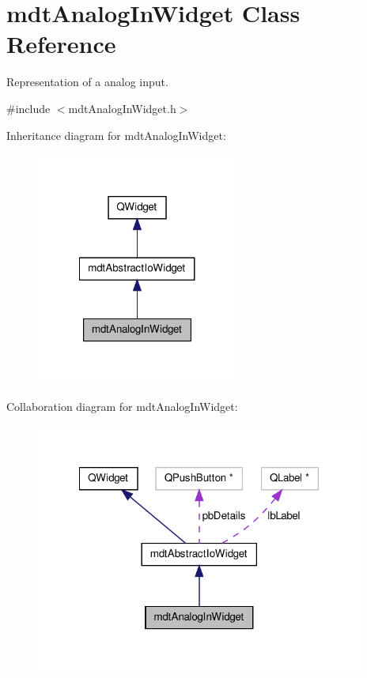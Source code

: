 \hypertarget{classmdt_analog_in_widget}{\section{mdt\-Analog\-In\-Widget Class Reference}
\label{classmdt_analog_in_widget}
}


Representation of a analog input.  




{\ttfamily \#include $<$mdt\-Analog\-In\-Widget.\-h$>$}



Inheritance diagram for mdt\-Analog\-In\-Widget\-:\nopagebreak
\begin{figure}[H]
\begin{center}
\leavevmode
\includegraphics[width=188pt]{classmdt_analog_in_widget__inherit__graph}
\end{center}
\end{figure}


Collaboration diagram for mdt\-Analog\-In\-Widget\-:\nopagebreak
\begin{figure}[H]
\begin{center}
\leavevmode
\includegraphics[width=306pt]{classmdt_analog_in_widget__coll__graph}
\end{center}
\end{figure}
